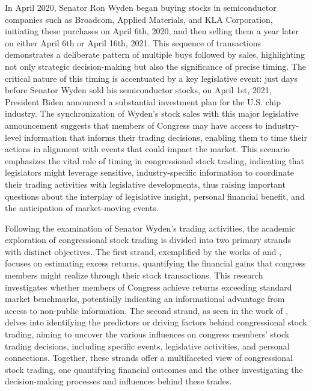 \documentclass[15pt,letterpaper]{article}
\begin{document}
In April 2020, Senator Ron Wyden began buying stocks in semiconductor companies such as Broadcom, Applied Materials, and KLA Corporation, initiating these purchases on April 6th, 2020, and then selling them a year later on either April 6th or April 16th, 2021. This sequence of transactions demonstrates a deliberate pattern of multiple buys followed by sales, highlighting not only strategic decision-making but also the significance of precise timing. The critical nature of this timing is accentuated by a key legislative event: just days before Senator Wyden sold his semiconductor stocks, on April 1st, 2021, President Biden announced a substantial investment plan for the U.S. chip industry. The synchronization of Wyden's stock sales with this major legislative announcement suggests that members of Congress may have access to industry-level information that informs their trading decisions, enabling them to time their actions in alignment with events that could impact the market. This scenario emphasizes the vital role of timing in congressional stock trading, indicating that legislators might leverage sensitive, industry-specific information to coordinate their trading activities with legislative developments, thus raising important questions about the interplay of legislative insight, personal financial benefit, and the anticipation of market-moving events.

Following the examination of Senator Wyden's trading activities, the academic exploration of congressional stock trading is divided into two primary strands with distinct objectives. The first strand, exemplified by the works of \cite{zi24, zi11} and \cite{eg13}, focuses on estimating excess returns, quantifying the financial gains that congress members might realize through their stock transactions. This research investigates whether members of Congress achieve returns exceeding standard market benchmarks, potentially indicating an informational advantage from access to non-public information. The second strand, as seen in the work of \cite{eg14}, delves into identifying the predictors or driving factors behind congressional stock trading, aiming to uncover the various influences on congress members’ stock trading decisions, including specific events, legislative activities, and personal connections. Together, these strands offer a multifaceted view of congressional stock trading, one quantifying financial outcomes and the other investigating the decision-making processes and influences behind these trades.
\end{document}
